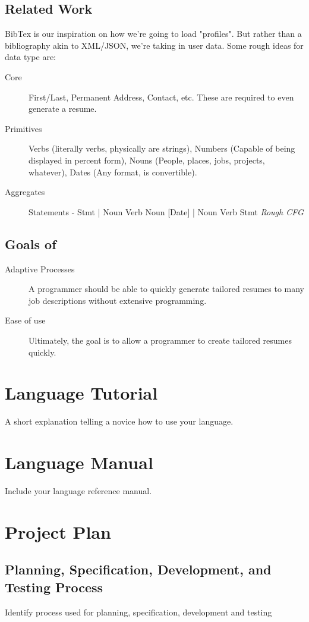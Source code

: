 \documentclass[12pt]{book}
\begin{document}
	\section{Related Work}
		BibTex is our inspiration on how we're going to load "profiles". But rather than a bibliography akin to XML/JSON, we're taking in user data.
		Some rough ideas for data type are:
		\begin{description}
			\item[Core] First/Last, Permanent Address, Contact, etc. These are required to even generate a resume.
			\item[Primitives] Verbs (literally verbs, physically are strings), Numbers (Capable of being displayed in percent form), Nouns (People, places, jobs, projects, whatever), Dates (Any format, is convertible).
			\item[Aggregates] Statements - Stmt | Noun Verb Noun [Date] | Noun Verb Stmt \emph{Rough CFG}
		\end{description}
	\section{Goals of \lang}
		\begin{description}
			\item[Adaptive Processes] A \lang programmer should be able to quickly generate tailored resumes to many job descriptions without extensive programming.
			\item[Ease of use] Ultimately, the goal is to allow a \lang programmer to create tailored resumes quickly.
		\end{description}

\tableofcontents
\mainmatter
\chapter{Language Tutorial}
A short explanation telling a novice how to use your language.

\chapter{Language Manual}
Include your language reference manual.

\chapter{Project Plan}
	\section{Planning, Specification, Development, and Testing Process}
		Identify process used for planning, specification, development and testing
\end{document}
